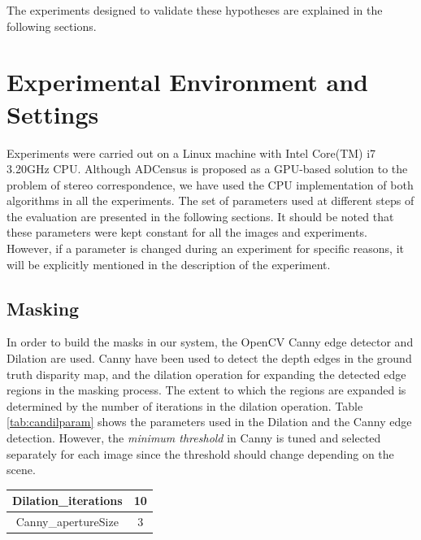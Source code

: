 The experiments designed to validate these hypotheses are explained in the following sections.

\section{Experimental Environment and Settings}
Experiments were carried out on a Linux machine with Intel Core(TM) i7 3.20GHz CPU. 
Although ADCensus is proposed as a GPU-based solution to the problem of stereo correspondence, 
we have used the CPU implementation of both algorithms in all the experiments.
The set of parameters used at different steps of the evaluation are presented in the following sections.
It should be noted that these parameters were kept constant for all the images and experiments. However, if a parameter is changed during an experiment for specific
reasons, it will be explicitly mentioned in the description of the experiment.

\subsection{Masking}
In order to build the masks in our system, the OpenCV Canny edge detector and Dilation are used.
Canny have been used to detect the depth edges in the ground truth disparity map, and the dilation operation 
for expanding the detected edge regions in the masking process. The extent to which the regions are expanded
is determined by the number of iterations in the dilation operation. Table \ref{tab:candilparam} shows the parameters used in the Dilation
and the Canny edge detection. However, the \textit{minimum threshold} in Canny is tuned and selected separately for each image 
since the threshold should change depending on the scene.

{\footnotesize
\begin{minipage}{\linewidth}
\begin{center}
\label{tab:candilparam}
\begin{tabular}{ |c|c| }
\hline
Dilation\_iterations & 10 \\  \hline
Canny\_apertureSize & 3 \\ \hline
\end{tabular}
\end{center}
\end{minipage} \newline
}

